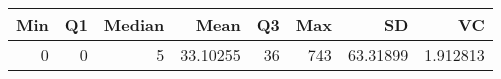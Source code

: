 
\begin{tabular}[t]{rrrrrrrr}
\toprule
Min & Q1 & Median & Mean & Q3 & Max & SD & VC\\
\midrule
0 & 0 & 5 & 33.10255 & 36 & 743 & 63.31899 & 1.912813\\
\bottomrule
\end{tabular}